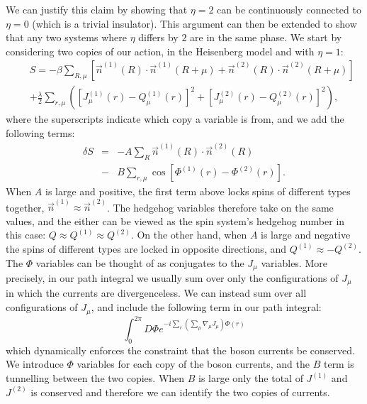 \documentclass[prb,twocolumn]{revtex4-1}
\begin{document}
We can justify this claim by showing that $\eta=2$ can be continuously connected to $\eta=0$ (which is a trivial insulator). This argument can then be extended to show that any two systems where $\eta$ differs by $2$ are in the same phase.
We start by considering two copies of our action, in the Heisenberg model and with $\eta=1$:
\begin{eqnarray}
&&S=-\beta\sum_{R,\mu}\left[ \vec{n}^{(1)}(R)\cdot \vec{n}^{(1)}(R+\mu)+\vec{n}^{(2)}(R)\cdot \vec{n}^{(2)}(R+\mu)\right]\nonumber\\
&&+\frac{\lambda}{2}\sum_{r,\mu}\left( [ J_\mu^{(1)}(r)- Q_\mu^{(1)}(r)]^2+[ J_\mu^{(2)}(r)- Q_\mu^{(2)}(r)]^2\right),
\label{doubleaction}
\end{eqnarray}
where the superscripts indicate which copy a variable is from, and we add the following terms:
\begin{eqnarray}
\delta S&=&-A\sum_{R} \vec{n}^{(1)}(R)\cdot \vec{n}^{(2)}(R)\nonumber\\
&-&B\sum_{r,\mu} \cos[\Phi^{(1)}(r)-\Phi^{(2)}(r)].
\label{AB}
\end{eqnarray} 
When $A$ is large and positive, the first term above locks spins of different types together, $\vec{n}^{(1)}\approx\vec{n}^{(2)}$. The hedgehog variables therefore take on the same values, and the either can be viewed as the spin system's hedgehog number in this case: $Q\approx Q^{(1)}\approx Q^{(2)}$. On the other hand, when $A$ is large and negative the spins of different types are locked in opposite directions, and $Q^{(1)}\approx-Q^{(2)}$. 
The $\Phi$ variables can be thought of as conjugates to the $J_\mu$ variables. More precisely, in our path integral we usually sum over only the configurations of $J_\mu$ in which the currents are divergenceless. We can instead sum over all configurations of $J_\mu$, and include the following term in our path integral:
\begin{equation}
\int_0^{2\pi} D\Phi e^{-i\sum_r (\sum_\mu\nabla_\mu J_\mu)\Phi(r)}
\end{equation}
which dynamically enforces the constraint that the boson currents be conserved. We introduce $\Phi$ variables for each copy of the boson currents, and the $B$ term is tunnelling between the two copies. 
When $B$ is large only the total of $J^{(1)}$ and $J^{(2)}$ is conserved and therefore we can identify the two copies of currents.
\end{document}
